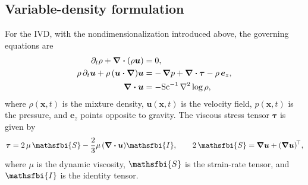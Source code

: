 \subsection{Variable-density formulation}
\label{sec:vd_equation}
For the IVD, with the nondimensionalization introduced above, the governing equations are
\begin{subequations}
    \label{eq:vd_nl_continuous}
    \begin{align}
        \label{eq:vd_nl_continuous_continuity}
        \partial_t \rho + \boldsymbol{\nabla}\boldsymbol{\cdot}(\rho \boldsymbol{u}) &= 0, \\
        \label{eq:vd_nl_continuous_momentum}
        \rho\,\partial_t \boldsymbol{u} + \rho\,(\boldsymbol{u}\boldsymbol{\cdot}\boldsymbol{\nabla})\boldsymbol{u} &= -\,\boldsymbol{\nabla} p + \boldsymbol{\nabla}\boldsymbol{\cdot}\boldsymbol{\tau} - \rho\,\boldsymbol{e}_z, \\
        \label{eq:vd_nl_continuous_divergence}
        \boldsymbol{\nabla} \boldsymbol{\cdot} \boldsymbol{u} &= -\mathrm{Sc}^{-1}\,\nabla^2 \log\rho,
    \end{align}
\end{subequations}
where \(\rho(\boldsymbol{x},t)\) is the mixture density, \(\boldsymbol{u}(\boldsymbol{x},t)\) is the
velocity field, \(p(\boldsymbol{x},t)\) is the pressure, and \(\boldsymbol{e}_z\) points
opposite to gravity. The viscous stress tensor \(\boldsymbol{\tau}\) is given by
\begin{equation}
    \label{eq:vd_stress_tensor}
    \boldsymbol{\tau} =  2\,\mu\,\mathsfbi{S} - \frac{2}{3}\mu\,(\bnabla\bcdot\boldsymbol{u})\mathsfbi{I}, \qquad 2\,\mathsfbi{S} = \bnabla\boldsymbol{u} + (\bnabla\boldsymbol{u})^{\!\top},
\end{equation}
where \(\mu\) is the dynamic viscosity, \(\mathsfbi{S}\) is the strain-rate tensor, and
\(\mathsfbi{I}\) is the identity tensor.

